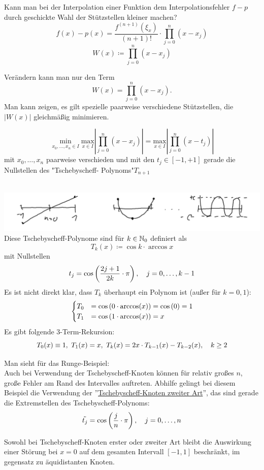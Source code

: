 \documentclass[../Skript.tex]{subfiles}
\begin{document}
\begin{question}
    Kann man bei der Interpolation einer Funktion dem Interpolationsfehler  $f-p$ durch geschickte Wahl der Stützstellen 
    kleiner machen?
    \[
f(x)-p(x)=\frac{f^{(n+1)}(\xi_x)}{(n+1)!}\cdot\prod^n_{j=0}(x-x_j)\]\[
W(x)\coloneqq \prod^n_{j=0}(x-x_j)
    \]
\end{question}
Verändern kann man nur den Term 
\[
W(x)= \prod^n_{j=0}(x-x_j).
\]
Man kann zeigen, es gilt spezielle paarweise verschiedene Stützstellen, die $|W(x)|$ gleichmäßig minimieren.\\
\begin{theorem}
    \[\underset{x_0,\dots,x_n\in I}{\min}\underset{x\in I}{\text{max}}\left|\prod^n_{j=0}(x-x_j) \right|=\underset{x\in 
    I}{\text{max}}\left|\prod^n_{j=0}(x-t_j) \right|\]
    mit $x_0,\dots,x_n$ paarweise verschieden und mit den $t_j\in [-1,+1]$ gerade die Nullstellen des "Tschebyscheff-
    Polynoms"\smallspace $T_{n+1}$\\
    
\end{theorem}
\begin{remark}\hfill\\
\includegraphics[width=\linewidth]{Bilder/abb1.png}
    Diese Tschebyscheff-Polynome sind für $k\in \mathbb{N}_0$ definiert als \[
    T_k(x)\coloneqq \cos{k\cdot \arccos{x}}
    \]
    mit Nullstellen \[
    t_j=\cos{\frac{2j+1}{2k}\cdot\pi}, \largespace j=0,\dots,k-1
    \]
    Es ist nicht direkt klar, dass $T_k$ überhaupt ein Polynom ist (außer für $k=0,1$):$$\\\begin{cases}
        T_0 &= \cos{0\cdot\arccos(x)} = \cos{0} = 1\\
        T_1 &= \cos{1\cdot\arccos(x)} = x
    \end{cases}$$
    Es gibt folgende 3-Term-Rekursion: \[
    T_0(x)\equiv 1, \ T_1(x) = x, \ T_k(x) = 2x\cdot T_{k-1}(x) - T_{k-2}(x), \hspace{1em} k\geq 2
    \]
\end{remark}
Man sieht für das Runge-Beispiel: \\
Auch bei Verwendung der Tschebyscheff-Knoten können für relativ großes $n$, große Fehler am Rand des Intervalles auftreten. 
Abhilfe gelingt bei diesem Beispiel die Verwendung der ''\underline{Tschebyscheff-Knoten zweiter Art}'', das sind gerade 
die Extremstellen des Tschebyscheff-Polynoms: \[
    \Tilde{t_j}=\cos{\frac{j}{n}\cdot \pi},\largespace j=0,\dots,n
\]
\begin{remark}
    Sowohl bei Tschebyscheff-Knoten erster oder zweiter Art bleibt die Auswirkung einer Störung bei $x=0$ auf dem gesamten
    Intervall $[-1,1]$ beschränkt, im gegensatz zu äquidistanten Knoten. 
\end{remark}
\end{document}
